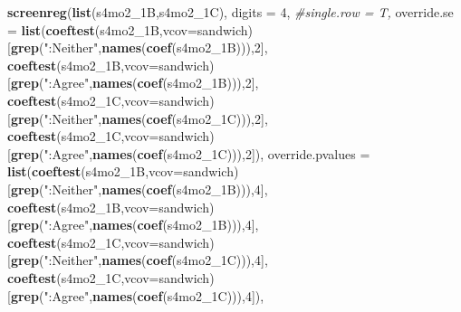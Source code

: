 \documentclass[
]{article}
\newenvironment{Shaded}{\begin{snugshade}}{\end{snugshade}}
\newcommand{\CommentTok}[1]{\textcolor[rgb]{0.56,0.35,0.01}{\textit{#1}}}
\newcommand{\DataTypeTok}[1]{\textcolor[rgb]{0.13,0.29,0.53}{#1}}
\newcommand{\DecValTok}[1]{\textcolor[rgb]{0.00,0.00,0.81}{#1}}
\newcommand{\KeywordTok}[1]{\textcolor[rgb]{0.13,0.29,0.53}{\textbf{#1}}}
\newcommand{\NormalTok}[1]{#1}
\newcommand{\StringTok}[1]{\textcolor[rgb]{0.31,0.60,0.02}{#1}}
\begin{document}
\begin{Shaded}
\begin{Highlighting}[]
\KeywordTok{screenreg}\NormalTok{(}\KeywordTok{list}\NormalTok{(s4mo2_1B,s4mo2_1C), }\DataTypeTok{digits =} \DecValTok{4}\NormalTok{, }\CommentTok{#single.row = T,}
          \DataTypeTok{override.se =} \KeywordTok{list}\NormalTok{(}\KeywordTok{coeftest}\NormalTok{(s4mo2_1B,}\DataTypeTok{vcov=}\NormalTok{sandwich)[}\KeywordTok{grep}\NormalTok{(}\StringTok{":Neither"}\NormalTok{,}\KeywordTok{names}\NormalTok{(}\KeywordTok{coef}\NormalTok{(s4mo2_1B))),}\DecValTok{2}\NormalTok{],}
                             \KeywordTok{coeftest}\NormalTok{(s4mo2_1B,}\DataTypeTok{vcov=}\NormalTok{sandwich)[}\KeywordTok{grep}\NormalTok{(}\StringTok{":Agree"}\NormalTok{,}\KeywordTok{names}\NormalTok{(}\KeywordTok{coef}\NormalTok{(s4mo2_1B))),}\DecValTok{2}\NormalTok{],}
                             \KeywordTok{coeftest}\NormalTok{(s4mo2_1C,}\DataTypeTok{vcov=}\NormalTok{sandwich)[}\KeywordTok{grep}\NormalTok{(}\StringTok{":Neither"}\NormalTok{,}\KeywordTok{names}\NormalTok{(}\KeywordTok{coef}\NormalTok{(s4mo2_1C))),}\DecValTok{2}\NormalTok{],}
                             \KeywordTok{coeftest}\NormalTok{(s4mo2_1C,}\DataTypeTok{vcov=}\NormalTok{sandwich)[}\KeywordTok{grep}\NormalTok{(}\StringTok{":Agree"}\NormalTok{,}\KeywordTok{names}\NormalTok{(}\KeywordTok{coef}\NormalTok{(s4mo2_1C))),}\DecValTok{2}\NormalTok{]),}
          \DataTypeTok{override.pvalues =} \KeywordTok{list}\NormalTok{(}\KeywordTok{coeftest}\NormalTok{(s4mo2_1B,}\DataTypeTok{vcov=}\NormalTok{sandwich)[}\KeywordTok{grep}\NormalTok{(}\StringTok{":Neither"}\NormalTok{,}\KeywordTok{names}\NormalTok{(}\KeywordTok{coef}\NormalTok{(s4mo2_1B))),}\DecValTok{4}\NormalTok{],}
                                  \KeywordTok{coeftest}\NormalTok{(s4mo2_1B,}\DataTypeTok{vcov=}\NormalTok{sandwich)[}\KeywordTok{grep}\NormalTok{(}\StringTok{":Agree"}\NormalTok{,}\KeywordTok{names}\NormalTok{(}\KeywordTok{coef}\NormalTok{(s4mo2_1B))),}\DecValTok{4}\NormalTok{],}
                                  \KeywordTok{coeftest}\NormalTok{(s4mo2_1C,}\DataTypeTok{vcov=}\NormalTok{sandwich)[}\KeywordTok{grep}\NormalTok{(}\StringTok{":Neither"}\NormalTok{,}\KeywordTok{names}\NormalTok{(}\KeywordTok{coef}\NormalTok{(s4mo2_1C))),}\DecValTok{4}\NormalTok{],}
                                  \KeywordTok{coeftest}\NormalTok{(s4mo2_1C,}\DataTypeTok{vcov=}\NormalTok{sandwich)[}\KeywordTok{grep}\NormalTok{(}\StringTok{":Agree"}\NormalTok{,}\KeywordTok{names}\NormalTok{(}\KeywordTok{coef}\NormalTok{(s4mo2_1C))),}\DecValTok{4}\NormalTok{]),}

\end{Highlighting}
\end{Shaded}
\end{document}
